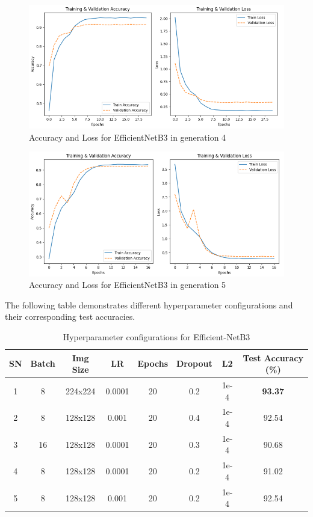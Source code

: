 \begin{figure}[htbp]
      \centering
      \includegraphics[scale=0.45]{images/GA_EfficientNet4.png}
      \caption{Accuracy and Loss for EfficientNetB3 in generation 4}
\end{figure}
\begin{figure}[htbp]
      \centering
      \includegraphics[scale=0.45]{images/GA_EfficientNet5.png}
      \caption{Accuracy and Loss for EfficientNetB3 in generation 5}
\end{figure}

\clearpage  %

The following table demonstrates different hyperparameter configurations and their corresponding test accuracies.

\begin{table}[h!]
      \centering
      \begin{tabular}{|c|c|c|c|c|c|c|c|}
          \hline
          \textbf{SN} & 
          \textbf{Batch} & \textbf{Img Size} & \textbf{LR} & \textbf{Epochs} & \textbf{Dropout} & \textbf{L2} & \textbf{Test Accuracy (\%)} \\
          \hline
          1 & 8   & 224x224 & 0.0001  & 20  & 0.2  & 1e-4  & \textbf{93.37} \\
          2 & 8   & 128x128 & 0.001   & 20  & 0.4  & 1e-4  & 92.54 \\
          3 & 16  & 128x128 & 0.0001  & 20  & 0.3  & 1e-4  & 90.68 \\
          4 & 8   & 128x128 & 0.0001  & 20  & 0.2  & 1e-4  & 91.02 \\
          5 & 8   & 128x128 & 0.001   & 20  & 0.2  & 1e-4  & 92.54 \\
          \hline
      \end{tabular}
      \caption{Hyperparameter configurations for Efficient-NetB3}
\end{table}

